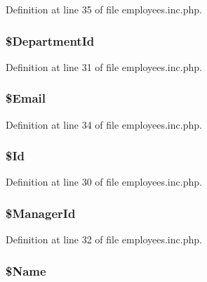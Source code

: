 \-Definition at line 35 of file employees.\-inc.\-php.

\hypertarget{class_employee_a2dd64d3f7291bbf8d6c4e10041eb40d8}{
\subsubsection[{\$\-Department\-Id}]{\setlength{\rightskip}{0pt plus 5cm}\$\-Department\-Id}}\label{class_employee_a2dd64d3f7291bbf8d6c4e10041eb40d8}


\-Definition at line 31 of file employees.\-inc.\-php.

\hypertarget{class_employee_a46da2886d0fe6510e2e0cd92aae2e79d}{
\subsubsection[{\$\-Email}]{\setlength{\rightskip}{0pt plus 5cm}\$\-Email}}\label{class_employee_a46da2886d0fe6510e2e0cd92aae2e79d}


\-Definition at line 34 of file employees.\-inc.\-php.

\hypertarget{class_employee_ae24f09f6f3375b938ae2625f53cea439}{
\subsubsection[{\$\-Id}]{\setlength{\rightskip}{0pt plus 5cm}\$\-Id}}\label{class_employee_ae24f09f6f3375b938ae2625f53cea439}


\-Definition at line 30 of file employees.\-inc.\-php.

\hypertarget{class_employee_a2185e0bdd33afb8b99dd58561f557f0c}{
\subsubsection[{\$\-Manager\-Id}]{\setlength{\rightskip}{0pt plus 5cm}\$\-Manager\-Id}}\label{class_employee_a2185e0bdd33afb8b99dd58561f557f0c}


\-Definition at line 32 of file employees.\-inc.\-php.

\hypertarget{class_employee_a90efb261c13e9a3e16ed2b0563dec08d}{
\subsubsection[{\$\-Name}]{\setlength{\rightskip}{0pt plus 5cm}\$\-Name}}\label{class_employee_a90efb261c13e9a3e16ed2b0563dec08d}


